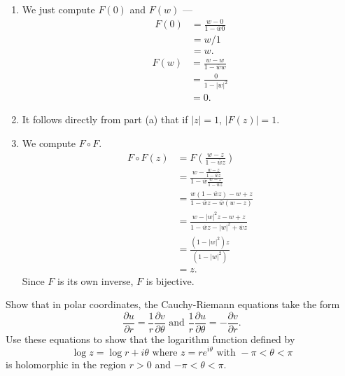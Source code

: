 \documentclass[12 pt, letterpaper]{hmcpset}
\begin{document}
\begin{solution}
\begin{enumerate}
\begin{enumerate}[label = (\roman*)]
					We can see that $F$ is holomorphic as it is the quotient of two holomorphic functions and $1 - \overline{w} z \neq 0$ since $\lvert \overline{w} z \rvert = \lvert w \rvert \lvert z \rvert < 1$.
				\item We just compute $F(0)$ and $F(w)$ ---
					\[
						\begin{split}
							F(0) & = \frac{w - 0}{1 - \overline{w} 0} \\
							     & = w/1 \\
							     & = w.
						\end{split}
					\]
					\[
						\begin{split}
							F(w) & = \frac{w - w}{1 - \overline{w} w} \\
							     & = \frac{0}{1 - \lvert w \rvert^{2}} \\
							     & = 0.
						\end{split}
					\]
				\item It follows directly from part (a) that if $\lvert z \rvert = 1$, $\lvert F(z) \rvert = 1$.
				\item We compute $F \circ F$.
					\[
						\begin{split}
							F \circ F(z) & = F \left ( \frac{w - z}{1 - \overline{w} z} \right ) \\
								     & = \frac{w - \frac{w - z}{1 - \overline{w} z}}{1 - \overline{w} \frac{w - z}{1 - \overline{w} z}} \\
								     & = \frac{w(1 - \overline{w} z) - w + z}{1 - \overline{w} z - \overline{w}(w - z)} \\
								     & = \frac{w - \lvert w \rvert^{2} z - w + z}{1 - \overline{w} z - \lvert w \rvert^{2} + \overline{w} z} \\
								     & = \frac{(1 - \lvert w \rvert^{2}) z}{(1 - \lvert w \rvert^{2})} \\
								     & = z.
						\end{split}
					\]
				Since $F$ is its own inverse, $F$ is bijective.
			\end{enumerate}
	\end{enumerate}
	
\end{solution}

\pagebreak

\begin{problem}[9]
	Show that in polar coordinates, the Cauchy-Riemann equations take the form
	\[
		\frac{\partial u}{\partial r} = \frac{1}{r} \frac{\partial v}{\partial \theta} \text{ and } \frac{1}{r} \frac{\partial u}{\partial \theta} = - \frac{\partial v}{\partial r}.
	\]
	Use these equations to show that the logarithm function defined by
	\[
		\log z = \log r + i \theta \text{ where } z = r e^{i \theta} \text{ with } -\pi < \theta < \pi
	\]
	is holomorphic in the region $r > 0$ and $-\pi < \theta < \pi$.
\end{problem}
\end{document}
